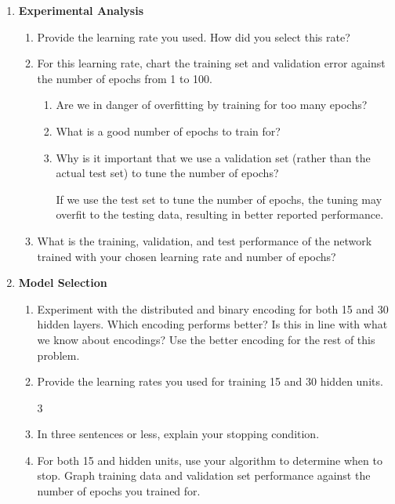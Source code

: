 \documentclass{article}
\begin{document}
\begin{enumerate}
  \item \textbf{Experimental Analysis}
    \begin{enumerate}
    \item Provide the learning rate you used. How did you select this rate?

    \item For this learning rate, chart the training set and validation error
      against the number of epochs from 1 to 100. 

      \begin{enumerate}
      \item Are we in danger of overfitting by training for too many epochs?


      \item What is a good number of epochs to train for?


      \item Why is it important that we use a validation set (rather than the
        actual test set) to tune the number of epochs?

        If we use the test set to tune the number of epochs, the tuning may 
        overfit to the testing data, resulting in better reported performance. 

      \end{enumerate}
    \item What is the training, validation, and test performance of the
      network trained with your chosen learning rate and number of epochs?

    \end{enumerate}

  \item \textbf{Model Selection}
    \begin{enumerate}
    \item Experiment with the distributed and binary encoding for both 15 and
      30 hidden layers. Which encoding performs better? Is this in line with what
      we know about encodings? Use the better encoding for the rest of this problem.

    \item Provide the learning rates you used for training 15 and 30 hidden units.

      \setcounter{enumii}3

    \item In three sentences or less, explain your stopping condition. 

    \item For both 15 and hidden units, use your algorithm to determine when to stop.
      Graph training data and validation set performance against the number of
      epochs you trained for.


\end{enumerate}
\end{enumerate}
\end{document}
